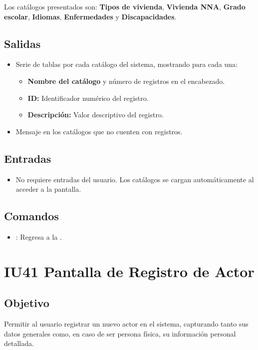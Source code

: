 Los catálogos presentados son: \textbf{Tipos de vivienda}, \textbf{Vivienda NNA}, 
\textbf{Grado escolar}, \textbf{Idiomas}, \textbf{Enfermedades} y 
\textbf{Discapacidades}.


\subsection{Salidas}
\begin{itemize}
	\item Serie de tablas por cada catálogo del sistema, mostrando para cada una:
	\begin{itemize}
		\item \textbf{Nombre del catálogo} y número de registros en el encabezado.
		\item \textbf{ID:} Identificador numérico del registro.
		\item \textbf{Descripción:} Valor descriptivo del registro.
	\end{itemize}
	\item Mensaje  en los catálogos que 
	no cuenten con registros.
\end{itemize}

\subsection{Entradas}
\begin{itemize}
	\item No requiere entradas del usuario. Los catálogos se cargan 
	automáticamente al acceder a la pantalla.
\end{itemize}

\subsection{Comandos}
\begin{itemize}
	\item {}: Regresa a la 
	.
\end{itemize}

\section{IU41 Pantalla de Registro de Actor}
\subsection{Objetivo}
Permitir al usuario registrar un nuevo actor en el sistema, capturando tanto sus 
datos generales como, en caso de ser persona física, su información personal 
detallada.
